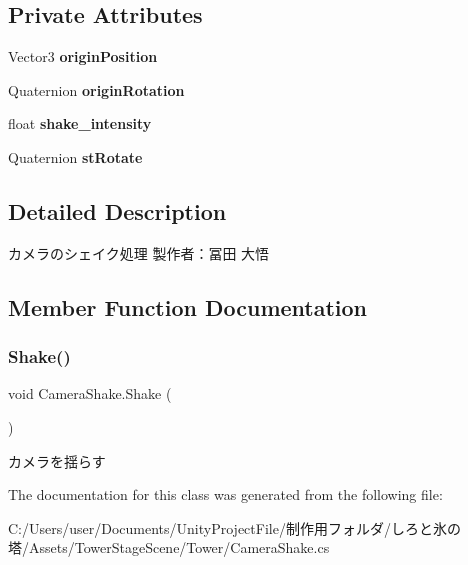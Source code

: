 \subsection*{Private Attributes}
\begin{DoxyCompactItemize}
\item 
\mbox{\label{class_camera_shake_a1276df52b28b1f198221640e54f7a3bb}} 
Vector3 {\bfseries origin\+Position}
\item 
\mbox{\label{class_camera_shake_a41f17a37a00e7f55be8ca3294f4f5eac}} 
Quaternion {\bfseries origin\+Rotation}
\item 
\mbox{\label{class_camera_shake_a655925c89e6eb6f681fee224ed650e65}} 
float {\bfseries shake\+\_\+intensity}
\item 
\mbox{\label{class_camera_shake_ab6292864d6b8abeea3a297cae86d4c37}} 
Quaternion {\bfseries st\+Rotate}
\end{DoxyCompactItemize}


\subsection{Detailed Description}
カメラのシェイク処理 製作者：冨田 大悟 



\subsection{Member Function Documentation}
\mbox{\label{class_camera_shake_a845c9b605bd8a8fcdf9ac5b14caa51b2}} 
\subsubsection{\texorpdfstring{Shake()}{Shake()}}
{\footnotesize\ttfamily void Camera\+Shake.\+Shake (\begin{DoxyParamCaption}{ }\end{DoxyParamCaption})\hspace{0.3cm}{\ttfamily [inline]}}



カメラを揺らす 



The documentation for this class was generated from the following file\+:\begin{DoxyCompactItemize}
\item 
C\+:/\+Users/user/\+Documents/\+Unity\+Project\+File/制作用フォルダ/しろと氷の塔/\+Assets/\+Tower\+Stage\+Scene/\+Tower/Camera\+Shake.\+cs\end{DoxyCompactItemize}
